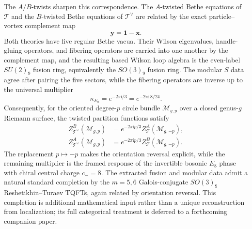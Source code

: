 \documentclass[11pt,a4paper]{article}
\numberwithin{equation}{section}
\begin{document}
The $A/B$-twists sharpen this correspondence.  The $A$-twisted Bethe equations of $\mathcal T$ and the $B$-twisted Bethe equations of $\mathcal T^\vee$ are related by the exact particle--vortex complement map
\begin{equation}
  \boldsymbol y=\boldsymbol 1-\boldsymbol x.
  \label{eq:intro-Bethe-complement}
\end{equation}
Both theories have five regular Bethe vacua.  Their Wilson eigenvalues, handle-gluing operators, and fibering operators are carried into one another by the complement map, and the resulting based Wilson loop algebra is the even-label $SU(2)_9$ fusion ring, equivalently the $SO(3)_9$ fusion ring.  The modular $S$ data agree after pairing the five sectors, while the fibering operators are inverse up to the universal multiplier
\begin{equation}
  \kappa_{E_8}=e^{-2\pi \mathrm{i}/3}=e^{-2\pi \mathrm{i}\,8/24}.
  \label{eq:intro-E8-framing}
\end{equation}
Consequently, for the oriented degree-$p$ circle bundle $\mathcal M_{g,p}$ over a closed genus-$g$ Riemann surface, the twisted partition functions satisfy
\begin{align}
  Z_{\mathcal T^\vee}^{B}(\mathcal M_{g,p})
  &=e^{-2\pi \mathrm{i}p/3}
    Z_{\mathcal T}^{A}(\mathcal M_{g,-p}),
  \nonumber\\
  Z_{\mathcal T^\vee}^{A}(\mathcal M_{g,p})
  &=e^{-2\pi \mathrm{i}p/3}
    Z_{\mathcal T}^{B}(\mathcal M_{g,-p}).
  \label{eq:intro-Seifert-mirror}
\end{align}
The replacement $p\mapsto -p$ makes the orientation reversal explicit, while the remaining multiplier is the framed response of the invertible bosonic $E_8$ phase with chiral central charge $c_-=8$.  The extracted fusion and modular data admit a natural standard completion by the $m=5,6$ Galois-conjugate $SO(3)_9$ Reshetikhin--Turaev TQFTs, again related by orientation reversal.  This completion is additional mathematical input rather than a unique reconstruction from localization; its full categorical treatment is deferred to a forthcoming companion paper.
\end{document}
